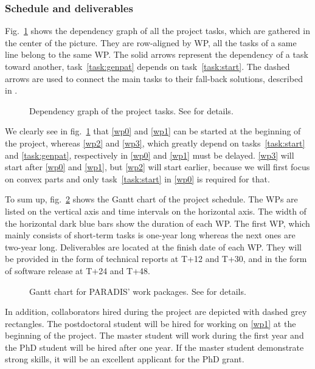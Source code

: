\subsubsection{Schedule and deliverables}
\label{sec:schedule}

Fig.~\ref{fig:tasks} shows the dependency graph of all the project tasks, which
are gathered in the center of the picture. They are row-aligned by WP,
\ie all the tasks of a same line belong to the same WP. 
The solid arrows represent the dependency of a task toward another,
\eg task~\ref{task:genpat} depends on task~\ref{task:start}. 
The dashed arrows are used to connect the main tasks to their fall-back solutions,
described in . 

\begin{figure}[htbp]
  \centering
  
  \caption{Dependency graph of the project tasks. See  for details.}
  \label{fig:tasks}
\end{figure}

We clearly see in fig.~\ref{fig:tasks} that \ref{wp0} and \ref{wp1} can be started
at the beginning of the project, whereas \ref{wp2} and \ref{wp3}, which greatly depend
on tasks~\ref{task:start} and \ref{task:genpat}, respectively in \ref{wp0} and \ref{wp1}
must be delayed. \ref{wp3} will start after \ref{wp0} and \ref{wp1}, but \ref{wp2} will
start earlier, because we will first focus on convex parts and only task~\ref{task:start}
in \ref{wp0} is required for that.

To sum up, fig.~\ref{fig:gantt} shows the Gantt chart of the project schedule.
The WPs are listed on the vertical axis and time intervals on the horizontal axis.
The width of the horizontal dark blue bars show the duration of each WP. The first WP,
which mainly consists of short-term tasks is one-year long whereas the next ones are
two-year long. Deliverables are located at the finish date of each WP. They will be
provided in the form of technical reports at T+12 and T+30, and in the form of software
release at T+24 and T+48.

\begin{figure}[htbp]
  \centering
  
  \caption{Gantt chart for PARADIS' work packages. See  for details.}
  \label{fig:gantt}
\end{figure}

In addition, collaborators hired during the project are depicted with dashed grey rectangles.
The postdoctoral student will be hired for working on \ref{wp1} at the beginning of the project.
The master student will work during the first year and the PhD student will be hired
after one year. If the master student demonstrate strong skills, it will be an excellent applicant
for the PhD grant.

